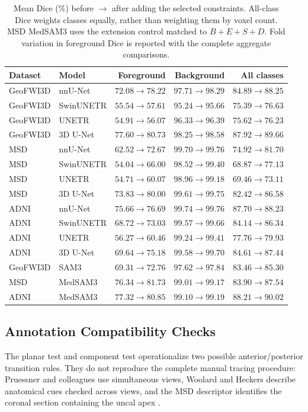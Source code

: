 \documentclass[12pt,a4paper]{article}
\begin{document}
\begin{table}[htbp]
\centering\footnotesize{}
\setlength{\tabcolsep}{4pt}\renewcommand{\arraystretch}{1.15}
\begin{tabular}{@{}llrrr@{}}
\hline
Dataset & Model & Foreground & Background & All classes \\
\hline
GeoFWI3D & nnU-Net & $72.08\to78.22$ & $97.71\to98.29$ & $84.89\to88.25$ \\
GeoFWI3D & SwinUNETR & $55.54\to57.61$ & $95.24\to95.66$ & $75.39\to76.63$ \\
GeoFWI3D & UNETR & $54.91\to56.07$ & $96.33\to96.39$ & $75.62\to76.23$ \\
GeoFWI3D & 3D U-Net & $77.60\to80.73$ & $98.25\to98.58$ & $87.92\to89.66$ \\
MSD & nnU-Net & $62.52\to72.67$ & $99.70\to99.76$ & $74.92\to81.70$ \\
MSD & SwinUNETR & $54.04\to66.00$ & $98.52\to99.40$ & $68.87\to77.13$ \\
MSD & UNETR & $54.71\to60.07$ & $98.96\to99.18$ & $69.46\to73.11$ \\
MSD & 3D U-Net & $73.83\to80.00$ & $99.61\to99.75$ & $82.42\to86.58$ \\
ADNI & nnU-Net & $75.66\to76.69$ & $99.74\to99.76$ & $87.70\to88.23$ \\
ADNI & SwinUNETR & $68.72\to73.03$ & $99.57\to99.66$ & $84.14\to86.34$ \\
ADNI & UNETR & $56.27\to60.46$ & $99.24\to99.41$ & $77.76\to79.93$ \\
ADNI & 3D U-Net & $69.64\to75.18$ & $99.58\to99.70$ & $84.61\to87.44$ \\
GeoFWI3D & SAM3 & $69.31\to72.76$ & $97.62\to97.84$ & $83.46\to85.30$ \\
MSD & MedSAM3 & $76.34\to81.73$ & $99.01\to99.17$ & $83.90\to87.54$ \\
ADNI & MedSAM3 & $77.32\to80.85$ & $99.10\to99.19$ & $88.21\to90.02$ \\
\hline
\end{tabular}
\caption{Mean Dice (\%) before $\to$ after adding the selected constraints. All-class Dice weights classes equally, rather than weighting them by voxel count. MSD MedSAM3 uses the extension control matched to $B+E+S+D$. Fold variation in foreground Dice is reported with the complete aggregate comparisons.}
\label{tab:complementary-dice-summary}
\end{table}


\subsection{Annotation Compatibility Checks}
\label{sec:annotation-results}
The planar test and component test operationalize two possible
anterior/posterior transition rules. They do not reproduce the complete
manual tracing procedure: Pruessner and colleagues use simultaneous
views, Woolard and Heckers describe anatomical cues checked across
views, and the MSD descriptor identifies the coronal section containing
the uncal apex \cite{pruessner2000volumetry,woolard2012asymmetry,simpson2019dataset}.
\end{document}
